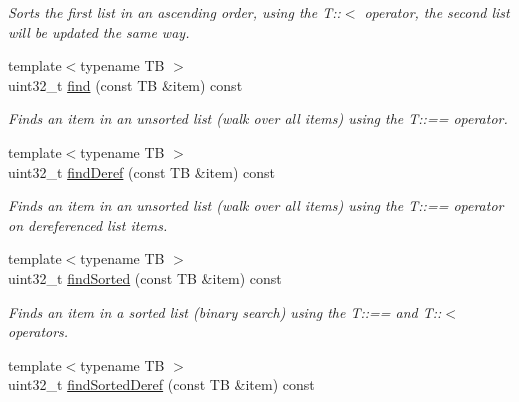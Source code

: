 \begin{DoxyCompactItemize}
\begin{DoxyCompactList}\small\item\em \-Sorts the first list in an ascending order, using the \-T\-:\-:$<$ operator, the second list will be updated the same way. \end{DoxyCompactList}\item 
\hypertarget{classxsens_1_1List_a080c4d6166ad72b9bd92c41cee296a59}{{\footnotesize template$<$typename T\-B $>$ }\\uint32\-\_\-t \hyperlink{classxsens_1_1List_a080c4d6166ad72b9bd92c41cee296a59}{find} (const \-T\-B \&item) const }\label{classxsens_1_1List_a080c4d6166ad72b9bd92c41cee296a59}

\begin{DoxyCompactList}\small\item\em \-Finds an item in an unsorted list (walk over all items) using the \-T\-:\-:== operator. \end{DoxyCompactList}\item 
\hypertarget{classxsens_1_1List_a01f9d16e4747d9aadd0e09379458c7f6}{{\footnotesize template$<$typename T\-B $>$ }\\uint32\-\_\-t \hyperlink{classxsens_1_1List_a01f9d16e4747d9aadd0e09379458c7f6}{find\-Deref} (const \-T\-B \&item) const }\label{classxsens_1_1List_a01f9d16e4747d9aadd0e09379458c7f6}

\begin{DoxyCompactList}\small\item\em \-Finds an item in an unsorted list (walk over all items) using the \-T\-:\-:== operator on dereferenced list items. \end{DoxyCompactList}\item 
\hypertarget{classxsens_1_1List_acc73d38a2f633255535439bbc1c99962}{{\footnotesize template$<$typename T\-B $>$ }\\uint32\-\_\-t \hyperlink{classxsens_1_1List_acc73d38a2f633255535439bbc1c99962}{find\-Sorted} (const \-T\-B \&item) const }\label{classxsens_1_1List_acc73d38a2f633255535439bbc1c99962}

\begin{DoxyCompactList}\small\item\em \-Finds an item in a sorted list (binary search) using the \-T\-:\-:== and \-T\-:\-:$<$ operators. \end{DoxyCompactList}\item 
\hypertarget{classxsens_1_1List_a0dbc32bd4f211c1ee5bf08bcb6792b93}{{\footnotesize template$<$typename T\-B $>$ }\\uint32\-\_\-t \hyperlink{classxsens_1_1List_a0dbc32bd4f211c1ee5bf08bcb6792b93}{find\-Sorted\-Deref} (const \-T\-B \&item) const }\label{classxsens_1_1List_a0dbc32bd4f211c1ee5bf08bcb6792b93}


\end{DoxyCompactItemize}
